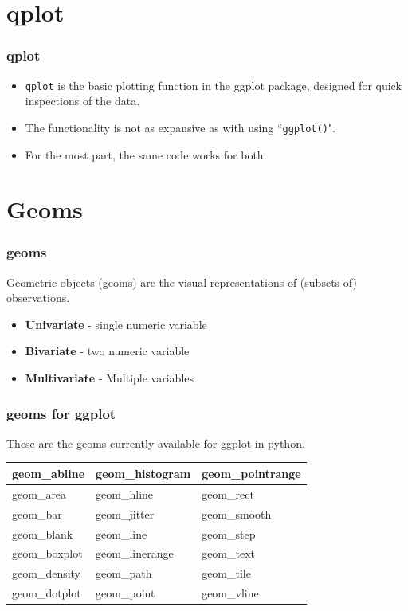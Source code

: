 \documentclass{beamer}
\begin{document}
\section{qplot}

\begin{frame}
\frametitle{qplot}
	\Large
\begin{itemize}
\item \texttt{qplot} is the basic plotting function in the ggplot package, designed for quick inspections of the data.
\item The functionality is not as expansive as with using ``\texttt{ggplot()}".
\item For the most part, the same code works for both.
\end{itemize}

\end{frame}
\section{Geoms}
\begin{frame}
	\frametitle{geoms}
	\Large
	Geometric objects (geoms) are the visual representations of (subsets of) observations.
	\begin{itemize}
		\item \textbf{Univariate} - single numeric variable
		\item \textbf{Bivariate} - two numeric variable
		\item \textbf{Multivariate} - Multiple variables
	\end{itemize}
\end{frame}
\begin{frame}
\frametitle{geoms for ggplot}
	\Large
These are the geoms currently available for ggplot in python. \\

\bigskip
	\begin{tabular}{|l|l|l	|}
		\hline
geom\_abline	&	geom\_histogram	&	geom\_pointrange	\\ \hline
geom\_area	&	geom\_hline	&	geom\_rect	\\ \hline
geom\_bar	&	geom\_jitter	&	geom\_smooth	\\ \hline
geom\_blank	&	geom\_line	&	geom\_step	\\ \hline
geom\_boxplot	&	geom\_linerange	&	geom\_text	\\ \hline
geom\_density	&	geom\_path	&	geom\_tile	\\ \hline
geom\_dotplot	&	geom\_point	&	geom\_vline	\\ \hline


	\end{tabular} 
\end{frame}
\end{document}
